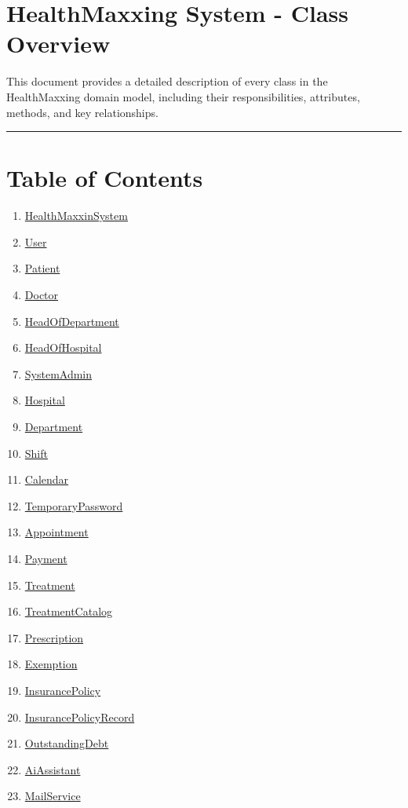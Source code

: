 \documentclass[12pt, a4paper]{article}
\begin{document}
\section*{HealthMaxxing System - Class Overview}

This document provides a detailed description of every class in the HealthMaxxing domain model, including their responsibilities, attributes, methods, and key relationships.

\par\medskip\hrule\medskip

\section*{Table of Contents}

\begin{enumerate}
    \item \hyperref[sec:1-healthmaxxinsystem]{HealthMaxxinSystem}
    \item \hyperref[sec:2-user]{User}
    \item \hyperref[sec:3-patient]{Patient}
    \item \hyperref[sec:4-doctor]{Doctor}
    \item \hyperref[sec:5-headofdepartment]{HeadOfDepartment}
    \item \hyperref[sec:6-headofhospital]{HeadOfHospital}
    \item \hyperref[sec:7-systemadmin]{SystemAdmin}
    \item \hyperref[sec:8-hospital]{Hospital}
    \item \hyperref[sec:9-department]{Department}
    \item \hyperref[sec:10-shift]{Shift}
    \item \hyperref[sec:11-calendar]{Calendar}
    \item \hyperref[sec:12-temporarypassword]{TemporaryPassword}
    \item \hyperref[sec:13-appointment]{Appointment}
    \item \hyperref[sec:14-payment]{Payment}
    \item \hyperref[sec:15-treatment]{Treatment}
    \item \hyperref[sec:16-treatmentcatalog]{TreatmentCatalog}
    \item \hyperref[sec:17-prescription]{Prescription}
    \item \hyperref[sec:18-exemption]{Exemption}
    \item \hyperref[sec:19-insurancepolicy]{InsurancePolicy}
    \item \hyperref[sec:20-insurancepolicyrecord]{InsurancePolicyRecord}
    \item \hyperref[sec:21-outstandingdebt]{OutstandingDebt}
    \item \hyperref[sec:22-aiassistant]{AiAssistant}
    \item \hyperref[sec:23-mailservice]{MailService}
\end{enumerate}
\end{document}
